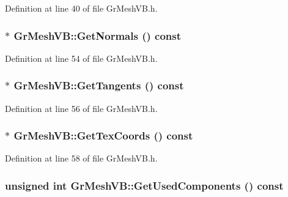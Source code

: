 Definition at line 40 of file GrMeshVB.h.\hypertarget{class_gr_mesh_v_b_6b7123162415ba4473262949117cf4bc}{
\subsubsection[{GetNormals}]{$\ast$ GrMeshVB::GetNormals () const}}
\label{class_gr_mesh_v_b_6b7123162415ba4473262949117cf4bc}




Definition at line 54 of file GrMeshVB.h.\hypertarget{class_gr_mesh_v_b_70c4f13e33162b71528a02287a33a744}{
\subsubsection[{GetTangents}]{$\ast$ GrMeshVB::GetTangents () const}}
\label{class_gr_mesh_v_b_70c4f13e33162b71528a02287a33a744}




Definition at line 56 of file GrMeshVB.h.\hypertarget{class_gr_mesh_v_b_da0cf2fb2929b3f307067f3ec4a7f298}{
\subsubsection[{GetTexCoords}]{$\ast$ GrMeshVB::GetTexCoords () const}}
\label{class_gr_mesh_v_b_da0cf2fb2929b3f307067f3ec4a7f298}




Definition at line 58 of file GrMeshVB.h.\hypertarget{class_gr_mesh_v_b_a9b69737d099558bab475e194f0d6048}{
\subsubsection[{GetUsedComponents}]{\setlength{\rightskip}{0pt plus 5cm}unsigned int GrMeshVB::GetUsedComponents () const}}
\label{class_gr_mesh_v_b_a9b69737d099558bab475e194f0d6048}




